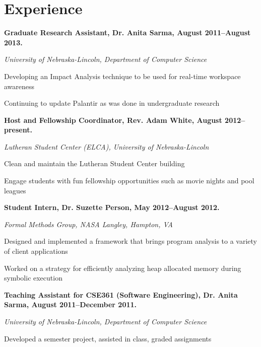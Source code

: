 \documentclass[10pt,letterpaper]{article}
\renewenvironment{itemize}{
  \begin{list}{}{
    \setlength{\leftmargin}{1.5em}
    \setlength{\itemsep}{0.25em}
    \setlength{\parskip}{0pt}
    \setlength{\parsep}{0.25em}
  }
}{
  \end{list}
}
\begin{document}
\section*{Experience}


\begin{itemize}
\item \textbf{Graduate Research Assistant, Dr. Anita Sarma, August
2011--August 2013.}
\item \emph{University of Nebraska-Lincoln, Department of Computer Science}
	\begin{itemize}
	\item Developing an Impact Analysis technique to be used for real-time workspace awareness
	\item Continuing to update Palantir as was done in undergraduate research
	\end{itemize}
\end{itemize}

\begin{itemize}
\item \textbf{Host and Fellowship Coordinator, Rev. Adam White, August 2012--present.}
\item \emph{Lutheran Student Center (ELCA), University of Nebraska-Lincoln}
    \begin{itemize}
    \item Clean and maintain the Lutheran Student Center building
    \item Engage students with fun fellowship opportunities such as movie nights and pool leagues
    \end{itemize}
\end{itemize}

\begin{itemize}
\item \textbf{Student Intern, Dr. Suzette Person, May 2012--August 2012.}
\item \emph{Formal Methods Group, NASA Langley, Hampton, VA}
    \begin{itemize}
    \item Designed and implemented a framework that brings program analysis to a variety of client applications
    \item Worked on a strategy for efficiently analyzing heap allocated
        memory during symbolic execution
    \end{itemize}
\end{itemize}

\begin{itemize}
\item \textbf{Teaching Assistant for CSE361 (Software Engineering), Dr. Anita Sarma, August 2011--December 2011.}
\item \emph{University of Nebraska-Lincoln, Department of Computer Science}
	\begin{itemize}
    \item Developed a semester project, assisted in class, graded assignments
	\end{itemize}
\end{itemize}
\end{document}
